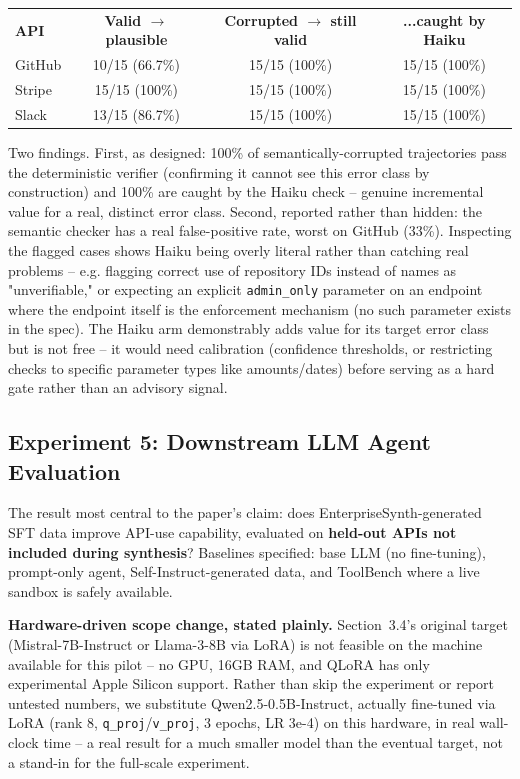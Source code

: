 \documentclass[11pt]{article}
\begin{document}
\begin{center}
\small
\begin{tabular}{lccc}
\textbf{API} & \textbf{Valid $\rightarrow$ plausible} & \textbf{Corrupted $\rightarrow$ still valid} & \textbf{...caught by Haiku} \\
GitHub & 10/15 (66.7\%) & 15/15 (100\%) & 15/15 (100\%) \\
Stripe & 15/15 (100\%) & 15/15 (100\%) & 15/15 (100\%) \\
Slack & 13/15 (86.7\%) & 15/15 (100\%) & 15/15 (100\%) \\
\end{tabular}
\end{center}

Two findings. First, as designed: 100\% of semantically-corrupted trajectories pass the
deterministic verifier (confirming it cannot see this error class by construction) and 100\% are
caught by the Haiku check -- genuine incremental value for a real, distinct error class. Second,
reported rather than hidden: the semantic checker has a real false-positive rate, worst on GitHub
(33\%). Inspecting the flagged cases shows Haiku being overly literal rather than catching real
problems -- e.g. flagging correct use of repository IDs instead of names as "unverifiable," or
expecting an explicit \texttt{admin\_only} parameter on an endpoint where the endpoint itself is
the enforcement mechanism (no such parameter exists in the spec). The Haiku arm demonstrably adds
value for its target error class but is not free -- it would need calibration (confidence
thresholds, or restricting checks to specific parameter types like amounts/dates) before serving
as a hard gate rather than an advisory signal.

\subsection{Experiment 5: Downstream LLM Agent Evaluation}
The result most central to the paper's claim: does EnterpriseSynth-generated SFT data improve
API-use capability, evaluated on \textbf{held-out APIs not included during synthesis}? Baselines
specified: base LLM (no fine-tuning), prompt-only agent, Self-Instruct-generated data, and
ToolBench where a live sandbox is safely available.

\textbf{Hardware-driven scope change, stated plainly.} Section~3.4's original target
(Mistral-7B-Instruct or Llama-3-8B via LoRA) is not feasible on the machine available for this
pilot -- no GPU, 16GB RAM, and QLoRA has only experimental Apple Silicon support. Rather than skip
the experiment or report untested numbers, we substitute Qwen2.5-0.5B-Instruct, actually fine-tuned
via LoRA (rank 8, \texttt{q\_proj}/\texttt{v\_proj}, 3 epochs, LR 3e-4) on this hardware, in real
wall-clock time -- a real result for a much smaller model than the eventual target, not a stand-in
for the full-scale experiment.
\end{document}

